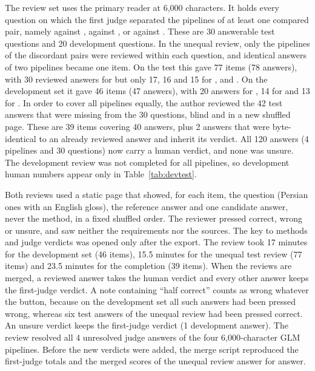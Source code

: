 The review set uses the primary reader at 6,000 characters.
It holds every question on which the first judge separated the pipelines of at least one compared pair, namely \lexb{} against \hybrid{}, \lexb{} against \hr{}, or \setr{} against \lexb{}.
These are 30 answerable test questions and 20 development questions.
In the unequal review, only the pipelines of the discordant pairs were reviewed within each question, and identical answers of two pipelines became one item.
On the test this gave 77 items (78 answers), with 30 reviewed answers for \lexb{} but only 17, 16 and 15 for \hybrid{}, \hr{} and \setr{}.
On the development set it gave 46 items (47 answers), with 20 answers for \lexb{}, 14 for \hybrid{} and 13 for \hr{}.
In order to cover all pipelines equally, the author reviewed the 42 test answers that were missing from the 30 questions, blind and in a new shuffled page.
These are 39 items covering 40 answers, plus 2 answers that were byte-identical to an already reviewed answer and inherit its verdict.
All 120 answers (4 pipelines and 30 questions) now carry a human verdict, and none was unsure.
The development review was not completed for all pipelines, so development human numbers appear only in Table~\ref{tab:devtest}.

Both reviews used a static page that showed, for each item, the question (Persian ones with an English gloss), the reference answer and one candidate answer, never the method, in a fixed shuffled order.
The reviewer pressed correct, wrong or unsure, and saw neither the requirements nor the sources.
The key to methods and judge verdicts was opened only after the export.
The review took 17 minutes for the development set (46 items), 15.5 minutes for the unequal test review (77 items) and 23.5 minutes for the completion (39 items).
When the reviews are merged, a reviewed answer takes the human verdict and every other answer keeps the first-judge verdict.
A note containing ``half correct'' counts as wrong whatever the button, because on the development set all such answers had been pressed wrong, whereas six test answers of the unequal review had been pressed correct.
An unsure verdict keeps the first-judge verdict (1 development answer).
The review resolved all 4 unresolved judge answers of the four 6,000-character GLM pipelines.
Before the new verdicts were added, the merge script reproduced the first-judge totals and the merged scores of the unequal review answer for answer.

